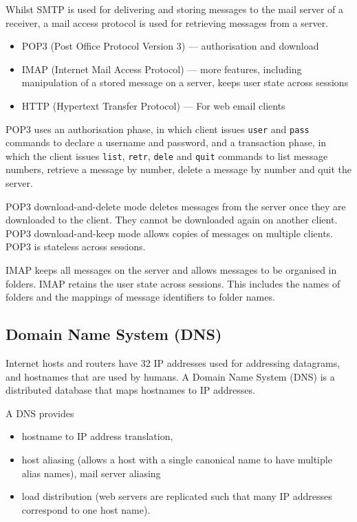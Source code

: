 Whilst SMTP is used for delivering and storing messages to the mail server of a receiver, a mail access protocol is used for retrieving messages from a server.
\begin{itemize}
  \item POP3 (Post Office Protocol Version 3) --- authorisation and download
  \item IMAP (Internet Mail Access Protocol) --- more features, including manipulation of a stored message on a server, keeps user state across sessions
  \item HTTP (Hypertext Transfer Protocol) --- For web email clients
\end{itemize}

POP3 uses an authorisation phase, in which client issues \texttt{user} and \texttt{pass} commands to declare a username and password, and a transaction phase, in which the client issues \texttt{list}, \texttt{retr}, \texttt{dele} and \texttt{quit} commands to list message numbers, retrieve a message by number, delete a message by number and quit the server.

POP3 download-and-delete mode deletes messages from the server once they are downloaded to the client.
They cannot be downloaded again on another client.
POP3 download-and-keep mode allows copies of messages on multiple clients.
POP3 is stateless across sessions.

IMAP keeps all messages on the server and allows messages to be organised in folders.
IMAP retains the user state across sessions.
This includes the names of folders and the mappings of message identifiers to folder names.

\subsection{Domain Name System (DNS)}

Internet hosts and routers have \SI{32}{\bit} IP addresses used for addressing datagrams, and hostnames that are used by humans.
A Domain Name System (DNS) is a distributed database that maps hostnames to IP addresses.

A DNS provides
\begin{itemize}
  \item hostname to IP address translation,
  \item host aliasing (allows a host with a single canonical name to have multiple alias names), mail server aliasing
  \item load distribution (web servers are replicated such that many IP addresses correspond to one host name).
\end{itemize}

